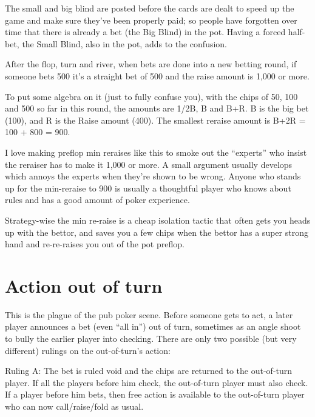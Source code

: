 
The small and big blind are posted before the cards are dealt to
speed up the game and make sure they've been properly paid; so
people have forgotten over time that there is already a bet
(the Big Blind) in the pot. Having a forced half-bet, the Small Blind,
also in the pot, adds to the confusion.

After the flop, turn and river, when bets are done into a new
betting round, if someone bets 500 it's a straight bet of 500
and the raise amount is 1,000 or more.

To put some algebra on it (just to fully confuse you), with the
chips of 50, 100 and 500 so far in this round, the amounts are
1/2B, B and B+R. B is the big bet (100), and R is the Raise amount (400).
The smallest reraise amount is B+2R = 100 + 800 = 900.

I love making preflop min reraises like this to smoke out
the ``experts'' who insist the reraiser has to make it 1,000
or more. A small argument usually develops which annoys the
experts when they're shown to be wrong. Anyone who stands
up for the min-reraise to 900 is usually a thoughtful player
who knows about rules and has a good amount of poker experience.

Strategy-wise the min re-raise is a cheap isolation tactic
that often gets you heads up with the bettor, and saves you
a few chips when the bettor has a super strong hand and
re-re-raises you out of the pot preflop.

\section{Action out of turn}

This is the plague of the pub poker scene. Before
someone gets to act, a later player announces a bet (even ``all in'')
out of turn, sometimes as an angle shoot to bully the earlier player
into checking. There are only two possible (but very different)
rulings on the out-of-turn's action:

Ruling A: The bet is ruled void and the chips are returned to the out-of-turn
player. If all the players before him check, the out-of-turn player
must also check. If a player before him bets, then free
action is available to the out-of-turn player who can now call/raise/fold
as usual.

